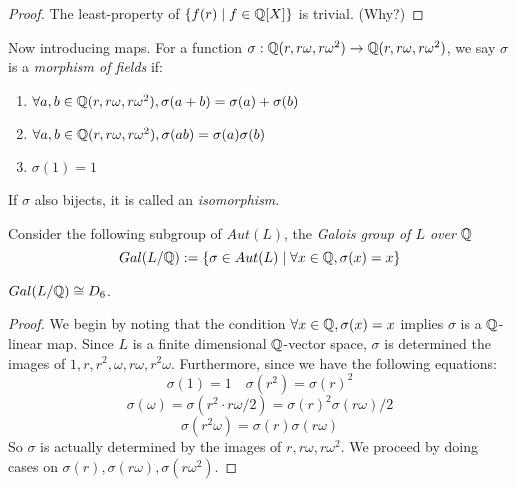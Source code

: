 \documentclass[../book.tex]{subfiles}
\begin{document}
\begin{eg}
\begin{proof}
    The least-property of $\{f(r) \mid f \in \mathbb{Q}[X] \}$ is trivial. (Why?)

\end{proof}


Now introducing maps. 
For a function $\sigma : \mathbb{Q}(r, r\omega, r\omega^2) \to 
\mathbb{Q}(r, r\omega, r\omega^2) $, 
we say $\sigma$ is a \emph{morphism of fields} if: 
\begin{enumerate}
    \item $\forall a, b \in \mathbb{Q}(r, r\omega, r\omega^2), 
        \sigma(a + b) = \sigma(a) + \sigma(b)$
    \item $\forall a, b \in \mathbb{Q}(r, r\omega, r\omega^2), 
        \sigma(ab) = \sigma(a)\sigma(b)$
    \item $\sigma(1) = 1$
\end{enumerate}
If $\sigma$ also bijects, it is called an \emph{isomorphism}.


Consider the following subgroup of $Aut(L)$, 
the \emph{Galois group of $L$ over $\mathbb{Q}$}
\[Gal(L/\mathbb{Q}) := \{\sigma \in Aut(L) \mid \forall x \in \mathbb{Q}, \sigma(x) = x\}\]

\begin{clm}
    $Gal(L/\mathbb{Q}) \cong D_6$. 
\end{clm}

\begin{proof} 
    We begin by noting that the condition $\forall x \in \mathbb{Q}, \sigma(x) = x$ 
    implies $\sigma$ is a $\mathbb{Q}$-linear map. 
    Since $L$ is a finite dimensional $\mathbb{Q}$-vector space, 
    $\sigma$ is determined the images of $1, r, r^2, \omega, r\omega, r^2\omega$.
    Furthermore, since we have the following equations: 
    \[ \sigma(1) = 1 \quad \sigma(r^2) = \sigma(r)^2 \]
    \[ \sigma(\omega) = \sigma(r^2 \cdot r\omega / 2) 
        = \sigma(r)^2\sigma(r\omega) / 2 \]
    \[ \sigma(r^2\omega) = \sigma(r) \sigma(r\omega) \]
    So $\sigma$ is actually determined by the images of $r, r\omega, r\omega^2$. 
    We proceed by doing cases on 
    $\sigma(r), \sigma(r\omega), \sigma(r\omega^2)$. 


\end{proof}
\end{eg}
\end{document}
